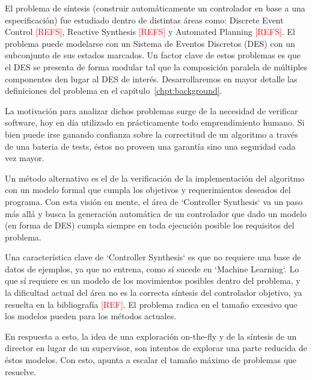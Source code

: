 El problema de síntesis (construir automáticamente un controlador en base a una especificación) fue estudiado dentro de distintas áreas como: Discrete Event Control \textcolor{red}{[REFS]}, Reactive Synthesis \textcolor{red}{[REFS]} y Automated Planning \textcolor{red}{[REFS]}. El problema puede modelarse con un Sistema de Eventos Discretos (DES) con un subconjunto de sus estados marcados. Un factor clave de estos problemas es que el DES se presenta de forma modular tal que la composición paralela de múltiples componentes den lugar al DES de interés. Desarrollaremos en mayor detalle las definiciones del problema en el capítulo~\ref{chpt:background}.

La motivación para analizar dichos problemas surge de la necesidad de verificar software, hoy en día utilizado en prácticamente todo emprendimiento humano. Si bien puede irse ganando confianza sobre la correctitud de un algoritmo a través de una bateria de tests, éstos no proveen una garantía sino una seguridad cada vez mayor. 

Un método alternativo es el de la verificación de la implementación del algoritmo con un modelo formal que cumpla los objetivos y requerimientos deseados del programa. Con esta visión en mente, el área de `Controller Synthesis` va un paso más allá y busca la generación automática de un controlador que dado un modelo (en forma de DES) cumpla siempre en toda ejecución posible los requisitos del problema.

Una característica clave de `Controller Synthesis` es que no requiere una base de datos de ejemplos, ya que no entrena, como sí sucede en `Machine Learning`. Lo que sí requiere es un modelo de los movimientos posibles dentro del problema, y la dificultad actual del área no es la correcta síntesis del controlador objetivo, ya resuelta en la bibliografía \textcolor{red}{[REF]}. El problema radica en el tamaño excesivo que los modelos pueden para los métodos actuales.

En respuesta a esto, la idea de una exploración on-the-fly y de la síntesis de un director en lugar de un supervisor, son intentos de explorar una parte reducida de éstos modelos. Con esto, apunta a escalar el tamaño máximo de problemas que resuelve. 


